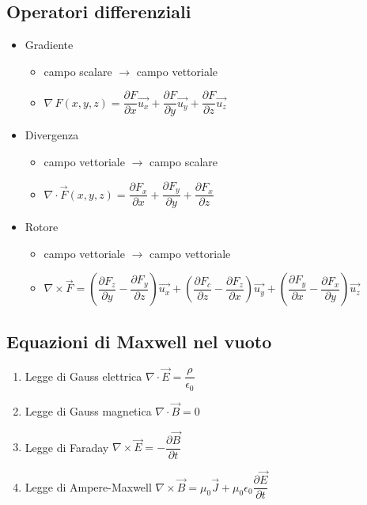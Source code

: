\documentclass{article}
\begin{document}
\subsection{Operatori differenziali}
\begin{itemize}
	\item Gradiente
	\begin{itemize}
		\item campo scalare \(\rightarrow\) campo vettoriale
		\item \( \nabla \, F(x, y, z) = \dfrac{\partial F}{\partial x} \vec{u_x} +  \dfrac{\partial F}{\partial y} \vec{u_y} + \dfrac{\partial F}{\partial z} \vec{u_z}\)
	\end{itemize}
	\item Divergenza
	\begin{itemize}
		\item campo vettoriale \(\rightarrow\) campo scalare
		\item \( \nabla \cdot \vec{F}(x, y, z) = \dfrac{\partial F_x}{\partial x} +  \dfrac{\partial F_y}{\partial y} + \dfrac{\partial F_x}{\partial z} \)
	\end{itemize}
	\item Rotore
	\begin{itemize}
		\item campo vettoriale \(\rightarrow\) campo vettoriale
		\item \( \nabla \times \vec{F} = \left( \dfrac{\partial F_z}{\partial y} -  \dfrac{\partial F_y}{\partial z} \right) \vec{u_x} + \left( \dfrac{\partial F_c}{\partial z} -  \dfrac{\partial F_z}{\partial x} \right) \vec{u_y} + \left( \dfrac{\partial F_y}{\partial x} -  \dfrac{\partial F_x}{\partial y} \right) \vec{u_z} \)
	\end{itemize}
\end{itemize}

\subsection{Equazioni di Maxwell nel vuoto}
\begin{enumerate}
	\item Legge di Gauss elettrica \( \nabla \cdot \vec{E} = \dfrac{\rho}{\epsilon_0} \)
	\item Legge di Gauss magnetica \( \nabla \cdot \vec{B} = 0 \)
	\item Legge di Faraday \( \nabla \times \vec{E} = - \dfrac{\partial \vec{B}}{\partial t} \)
	\item Legge di Ampere-Maxwell \( \nabla \times \vec{B} = \mu_0 \vec{J} + \mu_0 \epsilon_0 \dfrac{\partial \vec{E}}{\partial t} \)
\end{enumerate}
\end{document}
